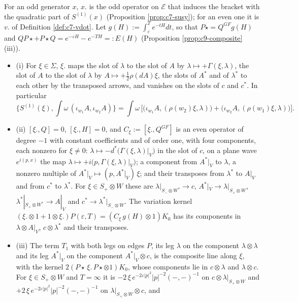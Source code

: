 \begin{lemma}
\label{lem:c11-lines}
For an odd generator $x$, $x.$ is the odd operator on $\mathscr E$ that induces the bracket with the quadratic part of $S^{(1)}(x)$ (Proposition \ref{prop:c7-susy}); for an even one it is $v.$ of Definition \ref{def:c7-vdot}. Let $g(H):=\int_\varepsilon^Te^{-tH}dt$, so that $P\star=Q^{GF}g(H)$ and $QP\star+P\star Q=e^{-\varepsilon H}-e^{-TH}=:E(H)$ (Proposition \ref{prop:c9-composite} (iii)).
\begin{itemize}
\item (i) For $\xi\in\Sigma$, $\xi.$ maps the slot of $\lambda$ to the slot of $A$ by $\lambda\mapsto+\Gamma(\xi,\lambda)$, the slot of $A$ to the slot of $\lambda$ by $A\mapsto+\tfrac12\rho(dA)\xi$, the slots of $A^*$ and of $\lambda^*$ to each other by the transposed arrows, and vanishes on the slots of $c$ and $c^*$. In particular
\[
\Big\{S^{(1)}(\xi),\int\omega\,(\iota_{w_1}A,\iota_{w_2}A)\Big\}=\int\omega\,\Big[\big(\iota_{w_1}A,(\rho(w_2)\xi,\lambda)\big)+\big(\iota_{w_2}A,(\rho(w_1)\xi,\lambda)\big)\Big].
\]
\item (ii) $[\xi.,Q]=0$, $[\xi.,H]=0$, and $C_\xi:=[\xi.,Q^{GF}]$ is an even operator of degree $-1$ with constant coefficients and of order one, with four components, each nonzero for $\xi\neq0$: $\lambda\mapsto-d^*\big(\Gamma(\xi,\lambda)|_V\big)$ in the slot of $c$, on a plane wave $e^{i(p,x)}$ the map $\lambda\mapsto+i\big(p,\Gamma(\xi,\lambda)|_V\big)$; a component from $A^*|_V$ to $\lambda$, a nonzero multiple of $A^*|_V\mapsto(p,A^*|_V)\,\xi$; and their transposes from $\lambda^*$ to $A|_V$ and from $c^*$ to $\lambda^*$. For $\xi\in S_+\otimes W$ these are $\lambda|_{S_-\otimes W^*}\to c$, $A^*|_V\to\lambda|_{S_+\otimes W}$, $\lambda^*|_{S_+\otimes W^*}\to A|_V$ and $c^*\to\lambda^*|_{S_-\otimes W}$. The variation kernel $(\xi.\otimes1+1\otimes\xi.)P(\varepsilon,T)=(C_\xi\,g(H)\otimes1)K_0$ has its components in $\lambda\otimes A|_V$, $c\otimes\lambda^*$ and their transposes.
\item (iii) The term $T_1$ with both legs on edges $P$, its leg $\lambda$ on the component $\lambda\otimes\lambda$ and its leg $A^*|_V$ on the component $A^*|_V\otimes c$, is the composite line along $\xi$, with the kernel $2(P\star\,\xi.\,P\star\otimes1)K_0$, whose components lie in $c\otimes\lambda$ and $\lambda\otimes c$. For $\xi\in S_+\otimes W$ and $T=\infty$ it is $-2\,\xi\,e^{-2\varepsilon|p|^2}|p|^{-2}(-,-)^{-1}$ on $c\otimes\lambda|_{S_+\otimes W}$ and $+2\,\xi\,e^{-2\varepsilon|p|^2}|p|^{-2}(-,-)^{-1}$ on $\lambda|_{S_+\otimes W}\otimes c$, and

\end{itemize}
\end{lemma}
